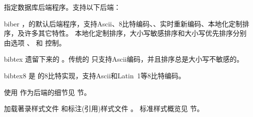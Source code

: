 \begin{optionlist}



指定数据库后端程序。支持以下后端：

\begin{valuelist}
	
\item[biber] %
\biber{}，\biblatex 的默认后端程序，支持Ascii、8比特编码、\utf{}、实时重新编码、本地化定制排序，及许多其它特性。
本地化定制排序，大小写敏感排序和大小写优先排序分别由选项 、 和  控制。

\item[bibtex] %
遗留下来的 \BibTeX{}。传统的 \BibTeX 只支持Ascii编码，并且排序总是大小写不敏感的。
	
\item[bibtex8] %
 是 \BibTeX 的8比特实现，支持Ascii和Latin~1等8比特编码。

\end{valuelist}

使用 \BibTeX 作为后端的细节见  节。



加载著录样式文件  和标注(引用)样式文件 。
标准样式概览见  节。




\end{optionlist}
